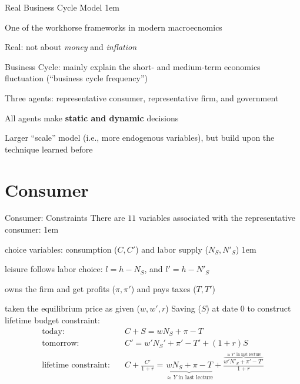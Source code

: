 \documentclass[11pt,aspectratio=43]{beamer}
\let\olditemize=\itemize
\let\endolditemize=\enditemize
\renewenvironment{itemize}{\olditemize \itemsep1em}{\endolditemize}
\theoremstyle{definition}
\begin{document}
\begin{frame}{Real Business Cycle Model}
\label{slide:Real_Business_Cycle_Model}
\begin{itemize}
    \item One of the workhorse frameworks in modern macroecnomics
    \item \alert{Real}: not about \textit{money} and \textit{inflation}
    \item \alert{Business Cycle}: mainly explain the short- and medium-term economics fluctuation (``business cycle frequency'')
    \item Three agents: representative consumer, representative firm, and government
    \item All agents make \textbf{static and dynamic} decisions
    \item Larger ``scale'' model (i.e., more endogenous variables), but build upon the technique learned before
\end{itemize}
\end{frame}

\section{Consumer}
\label{sec:Consumer}

\begin{frame}{Consumer: Constraints}
\label{slide:Consumer__Constraints}
There are \alert{$ 11 $} variables associated with the representative consumer:
\begin{itemize}
    \item choice variables: consumption ($C, C'$) and labor supply ($N_{S}, N'_{S}$)
    \begin{itemize}
        \item leisure follows labor choice: $ l = h - N_{S} $, and $ l' = h - N'_{S} $
    \end{itemize}
    \item owns the firm and get profits ($ \pi, \pi' $) and pays taxes ($T, T'$)
    \item taken the equilibrium price as given ($w, w', r$)
\end{itemize}
%
Saving ($S$) at date 0 to construct lifetime budget constraint:
\begin{align*}
    \text{today:} \quad
        & C + S = w N_{S} + \pi - T
    \\
    \text{tomorrow:} \quad
        & C' = w' N_{S}' + \pi' - T' + ( 1+r ) S
    \\
    \text{lifetime constraint:} \quad
        & C + \frac{C'}{1+r} =
            \underbrace{w N_{S} + \pi - T}_{\approx Y \text{ in last lecture}}
            + \frac{\overbrace{w' N'_{S} + \pi' - T'}^{\approx Y' \text{ in last lecture}}}{1+r}
\end{align*}
%
\end{frame}
\end{document}
